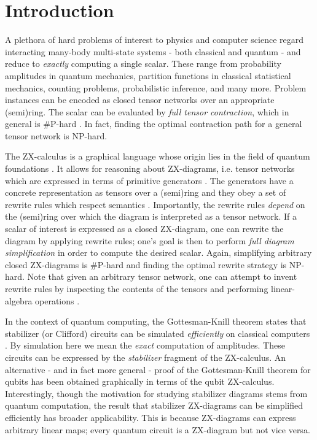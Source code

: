 \section{Introduction}


A plethora of hard problems of interest to physics and computer science
regard interacting many-body multi-state systems - both classical and quantum -
and reduce to \emph{exactly} computing a single scalar.
These range from probability amplitudes in quantum mechanics,
partition functions in classical statistical mechanics,
counting problems, probabilistic inference, and many more.
Problem instances can be encoded as closed
tensor networks over an appropriate (semi)ring.
The scalar can be evaluated by \emph{full tensor contraction},
which in general is \#P-hard \cite{Damm2002}.
In fact, finding the optimal contraction path for a general tensor network is NP-hard.

The ZX-calculus is a graphical language whose origin lies in the field of quantum foundations \cite{Coecke2011}.
It allows for reasoning about ZX-diagrams, i.e. tensor networks which are expressed in terms of primitive generators \cite{vandewetering2020zxcalculus}.
The generators have a concrete representation as tensors over
a (semi)ring and they obey a set of rewrite rules which respect semantics \cite{wang2020completeness}.
Importantly, the rewrite rules \emph{depend} on the (semi)ring over which the diagram is interpreted as a tensor network.
If a scalar of interest is expressed as a closed ZX-diagram,
one can rewrite the diagram by applying rewrite rules; one's goal is then to perform \emph{full diagram simplification} in order to compute the desired scalar.
Again, simplifying arbitrary closed ZX-diagrams is \#P-hard and finding the optimal rewrite strategy is NP-hard.
Note that
given an arbitrary tensor network, one can attempt to invent rewrite rules by inspecting the contents of the tensors and performing linear-algebra operations \cite{gray2020hyperoptimized}.

In the context of quantum computing,
the Gottesman-Knill theorem states that stabilizer (or Clifford) circuits can be
simulated \emph{efficiently} on classical computers \cite{Aaronson2004}.
By simulation here we mean the \emph{exact} computation of amplitudes.
These circuits can be expressed by the \emph{stabilizer} fragment of the ZX-calculus.
An alternative - and in fact more general - proof of the Gottesman-Knill theorem for qubits has been obtained graphically in terms of the qubit ZX-calculus.
Interestingly, though the motivation for studying stabilizer diagrams stems from quantum computation, the result that stabilizer ZX-diagrams can be simplified efficiently has broader applicability. This is because
ZX-diagrams can express arbitrary linear maps;
every quantum circuit is a ZX-diagram but not vice versa.

